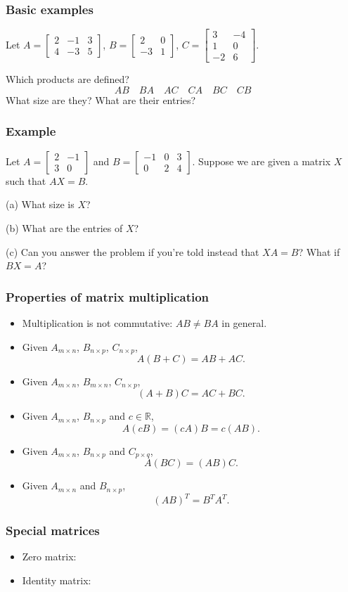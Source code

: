 \documentclass[11pt,t]{beamer}
\begin{document}
\begin{frame}\frametitle{Basic examples}
Let $A = \begin{bmatrix}2&-1&3\\4&-3&5\end{bmatrix}$, $B = \begin{bmatrix}2&0\\-3&1\end{bmatrix}$, $C=\begin{bmatrix}3&-4\\1&0\\-2&6\end{bmatrix}$.

Which products are defined?
\[
AB \quad BA \quad AC \quad CA \quad BC \quad CB
\]
What size are they? What are their entries?
\end{frame}
\begin{frame}\frametitle{Example}
Let $A = \begin{bmatrix}
2&-1\\3&0
\end{bmatrix}$ and $B = \begin{bmatrix}-1&0&3\\0&2&4\end{bmatrix}$. Suppose we are given a matrix $X$ such that $AX=B$.

(a) What size is $X$?

\bigskip

(b) What are the entries of $X$?

\bigskip

(c) Can you answer the problem if you're told instead that $XA=B$? What if $BX=A$?
\end{frame}
\begin{frame}\frametitle{Properties of matrix multiplication}
\begin{itemize}
\item Multiplication is \alert{not commutative}: $AB\neq BA$ in general.
\item Given $A_{m\times n}$, $B_{n\times p}$, $C_{n\times p}$, 
\[A(B+C) = AB+AC.\]
\item Given $A_{m\times n}$, $B_{m\times n}$, $C_{n\times p}$, 
\[(A+B)C = AC+BC.\]
\item Given $A_{m\times n}$, $B_{n\times p}$ and $c\in\mathbb{R}$, 
\[A(cB) = (cA)B = c(AB).\]
\item Given $A_{m\times n}$, $B_{n\times p}$ and $C_{p\times q}$, 
\[A(BC)=(AB)C.\] 
\item Given $A_{m\times n}$ and $B_{n\times p}$, 
\[(AB)^T = B^TA^T.\]
\end{itemize}
\end{frame}
\begin{frame}\frametitle{Special matrices}
\begin{itemize}
\item Zero matrix:

\vspace{1in}

\item Identity matrix:

\end{itemize}

\end{frame}
\end{document}
